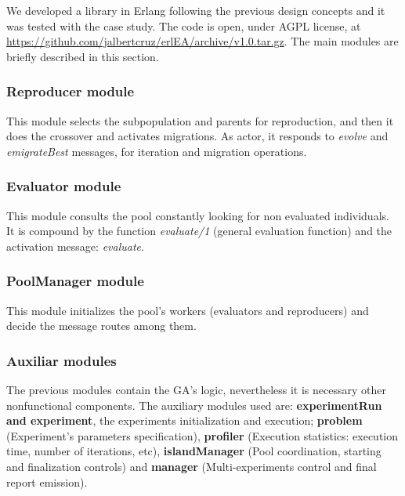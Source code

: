 
We developed a library in Erlang following the previous design concepts and it was tested with the case study. The code is open, under AGPL license, at \url{https://github.com/jalbertcruz/erlEA/archive/v1.0.tar.gz}. The main modules are briefly described in this section.

\subsubsection{Reproducer module}

This module selects the subpopulation and parents for reproduction, and then it does the crossover and activates migrations. As actor, it responds to {\em evolve} and {\em emigrateBest} messages, for iteration and migration operations.

\subsubsection{Evaluator module}

This module consults the pool constantly looking for non evaluated individuals. It is compound by the function {\em evaluate/1} (general evaluation function) and the activation message: {\em evaluate}.

\subsubsection{PoolManager module}

This module initializes the pool’s workers (evaluators and reproducers) and decide the message routes among them.

\subsubsection{Auxiliar modules}

The previous modules contain the GA’s logic, nevertheless it is necessary other nonfunctional components. The auxiliary modules used are: \textbf{experimentRun and experiment}, the experiments initialization and execution; \textbf{problem} (Experiment’s parameters specification), \textbf{profiler} (Execution statistics: execution time, number of iterations, etc), \textbf{islandManager} (Pool coordination, starting and finalization controls) and \textbf{manager} (Multi-experiments control and final report emission).

